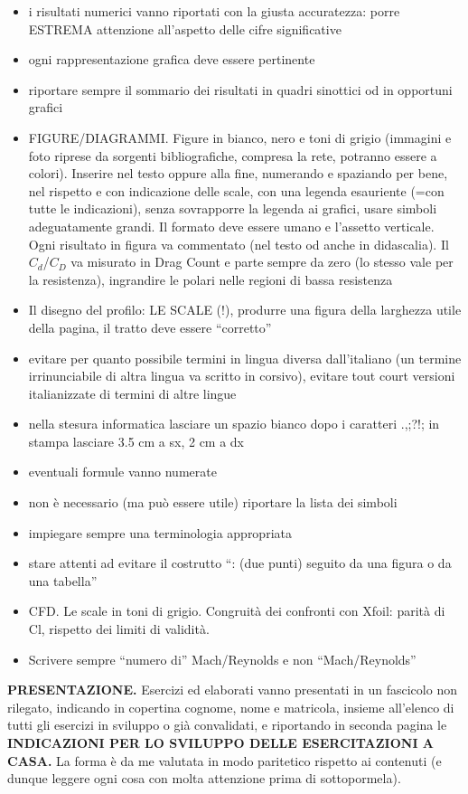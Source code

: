\begin{itemize}
\item{ i risultati numerici vanno riportati con la giusta accuratezza: porre ESTREMA attenzione all'aspetto delle cifre significative}
\item{ ogni rappresentazione grafica deve essere pertinente}
\item{ riportare sempre il sommario dei risultati in quadri sinottici od in opportuni grafici}
\item{ FIGURE/DIAGRAMMI. Figure in bianco, nero e toni di grigio (immagini e foto riprese da sorgenti bibliografiche,
compresa la rete, potranno essere a colori). Inserire nel testo oppure alla fine, numerando e spaziando per bene, nel rispetto 
e con indicazione delle scale, con una legenda esauriente (=con tutte le indicazioni), senza sovrapporre la legenda ai grafici,
usare simboli adeguatamente grandi. Il formato deve essere umano e l'assetto verticale. Ogni risultato in figura va
commentato (nel testo od anche in didascalia). Il $C_d$/$C_D$ va misurato in Drag Count e parte sempre da zero (lo stesso vale
per la resistenza), ingrandire le polari nelle regioni di bassa resistenza}
\item{ Il disegno del profilo: LE SCALE (!), produrre una figura della larghezza utile della pagina, il tratto deve essere “corretto”}
\item{ evitare per quanto possibile termini in lingua diversa dall'italiano (un termine irrinunciabile di altra lingua va scritto in
corsivo), evitare tout court versioni italianizzate di termini di altre lingue}
\item{ nella stesura informatica lasciare un spazio bianco dopo i caratteri .,;?!; in stampa lasciare 3.5 cm a sx, 2 cm a dx}
\item{ eventuali formule vanno numerate}
\item{ non è necessario (ma può essere utile) riportare la lista dei simboli}
\item{ impiegare sempre una terminologia appropriata}
\item{ stare attenti ad evitare il costrutto “: (due punti) seguito da una figura o da una tabella”}
\item{ CFD. Le scale in toni di grigio. Congruità dei confronti con Xfoil: parità di Cl, rispetto dei limiti di validità.}
\item{ Scrivere sempre “numero di” Mach/Reynolds e non “Mach/Reynolds”}
\end{itemize}
{\bfseries PRESENTAZIONE.} Esercizi ed elaborati vanno presentati in un fascicolo non rilegato, indicando in copertina cognome, nome e matricola, insieme all’elenco di tutti gli esercizi in sviluppo o già convalidati, e riportando in seconda pagina le  {\bfseries INDICAZIONI PER LO SVILUPPO DELLE ESERCITAZIONI A CASA.} La forma è da me valutata in modo paritetico rispetto ai contenuti (e dunque leggere ogni cosa con molta attenzione prima di sottopormela).\\
